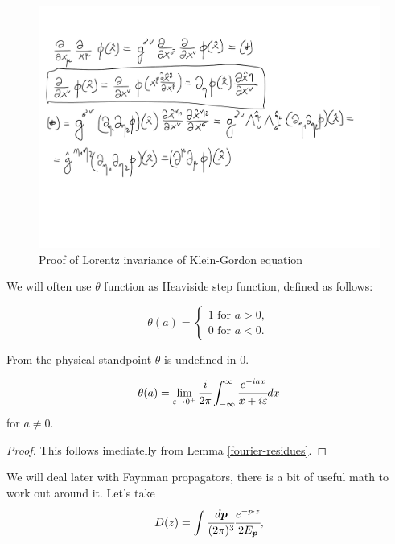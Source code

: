 \documentclass[main.tex]{subfiles}
\begin{document}
\begin{figure}[H]
\label{klein-proof}
\includegraphics[scale=0.5]{figs/KleinInvariance}
\caption{Proof of Lorentz invariance of Klein-Gordon equation}
\end{figure}


We will often use $\theta$ function as Heaviside step function, defined as follows:

\begin{equation}
\theta(a) = 
\begin{cases}
1 \text{ for } a > 0,\\
0 \text{ for } a < 0.
\end{cases}
\end{equation}

From the physical standpoint $\theta$ is undefined in $0$.

\begin{proposition}
\begin{equation}
\theta(a) = \lim\limits_{\epsilon\to 0^+} \cfrac{i}{2\pi} \int_{-\infty}^\infty  \cfrac{e^{-iax}}{x + i\epsilon} dx
\end{equation}
for $a\not=0$.
\end{proposition}
\begin{proof} This follows imediatelly from Lemma \ref{fourier-residues}.
\end{proof}

We will deal later with Faynman propagators, there is a bit of useful math to work out around it.
Let's take
\begin{equation}
D(z) =  \int \cfrac{d \bs{p}}{(2\pi)^3}
\cfrac{e^{-p \cdot z}}{2E_{\bs{p}}}, 
\end{equation}
\end{document}
